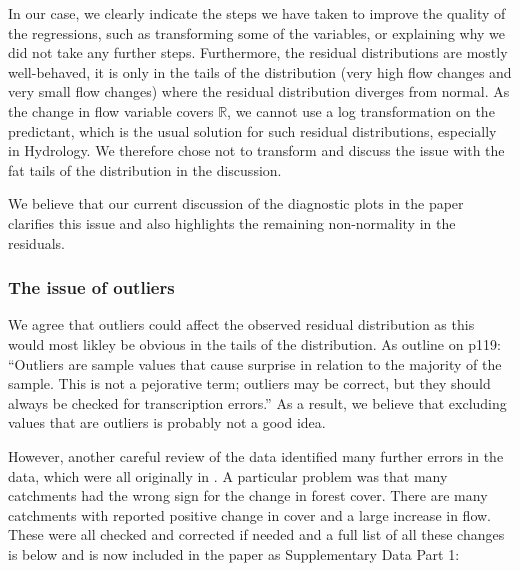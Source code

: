 \documentclass[]{elsarticle} %
\begin{document}
In our case, we clearly indicate the steps we have taken to improve the quality of the regressions, such as transforming some of the variables, or explaining why we did not take any further steps. Furthermore, the residual distributions are mostly well-behaved, it is only in the tails of the distribution (very high flow changes and very small flow changes) where the residual distribution diverges from normal. As the change in flow variable covers \(\mathbb{R}\), we cannot use a log transformation on the predictant, which is the usual solution for such residual distributions, especially in Hydrology. We therefore chose not to transform and discuss the issue with the fat tails of the distribution in the discussion.

We believe that our current discussion of the diagnostic plots in the paper clarifies this issue and also highlights the remaining non-normality in the residuals.

\hypertarget{the-issue-of-outliers}{%
\subsubsection{The issue of outliers}\label{the-issue-of-outliers}}

We agree that outliers could affect the observed residual distribution as this would most likley be obvious in the tails of the distribution. As \citet{venables2013modern} outline on p119:
``Outliers are sample values that cause surprise in relation to the majority of the sample. This is not a pejorative term; outliers may be correct, but they should always be checked for transcription errors.'' As a result, we believe that excluding values that are outliers is probably not a good idea.

However, another careful review of the data identified many further errors in the data, which were all originally in \citet{zhang2017}. A particular problem was that many catchments had the wrong sign for the change in forest cover. There are many catchments with reported positive change in cover and a large increase in flow. These were all checked and corrected if needed and a full list of all these changes is below and is now included in the paper as Supplementary Data Part 1:
\end{document}
